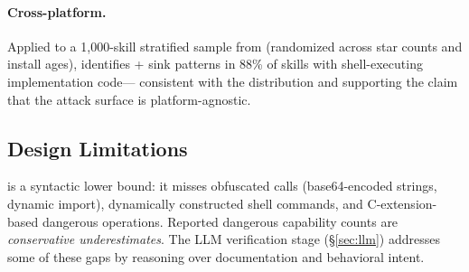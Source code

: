 \paragraph{Cross-platform.}
Applied to a 1,000-skill stratified sample from \skillssh{}
(randomized across star counts and install ages),
\lscps identifies \NpatternsLSCPS{}+ sink patterns in 88\% of skills
with shell-executing implementation code---
consistent with the \clawhub distribution and supporting the claim
that the attack surface is platform-agnostic.

\subsection{Design Limitations}

\lscps is a syntactic lower bound: it misses obfuscated calls
(base64-encoded strings, dynamic import), dynamically constructed
shell commands, and C-extension-based dangerous operations.
Reported dangerous capability counts are
\emph{conservative underestimates}.
The LLM verification stage (\S\ref{sec:llm}) addresses some of these
gaps by reasoning over documentation and behavioral intent.
